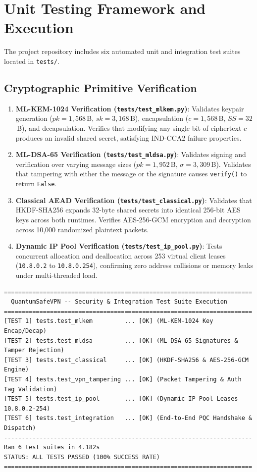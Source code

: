 \section{Unit Testing Framework and Execution}
\label{sec:unit_testing_execution}

The project repository includes six automated unit and integration test suites located in \texttt{tests/}.

\subsection{Cryptographic Primitive Verification}
\begin{enumerate}
    \item \textbf{ML-KEM-1024 Verification (\texttt{tests/test\_mlkem.py})}: Validates keypair generation ($pk = 1,568$\,B, $sk = 3,168$\,B), encapsulation ($c = 1,568$\,B, $SS = 32$\,B), and decapsulation. Verifies that modifying any single bit of ciphertext $c$ produces an invalid shared secret, satisfying IND-CCA2 failure properties.
    \item \textbf{ML-DSA-65 Verification (\texttt{tests/test\_mldsa.py})}: Validates signing and verification over varying message sizes ($pk = 1,952$\,B, $\sigma = 3,309$\,B). Validates that tampering with either the message or the signature causes \texttt{verify()} to return \texttt{False}.
    \item \textbf{Classical AEAD Verification (\texttt{tests/test\_classical.py})}: Validates that HKDF-SHA256 expands 32-byte shared secrets into identical 256-bit AES keys across both runtimes. Verifies AES-256-GCM encryption and decryption across 10,000 randomized plaintext packets.
    \item \textbf{Dynamic IP Pool Verification (\texttt{tests/test\_ip\_pool.py})}: Tests concurrent allocation and deallocation across 253 virtual client leases (\texttt{10.8.0.2} to \texttt{10.8.0.254}), confirming zero address collisions or memory leaks under multi-threaded load.
\end{enumerate}

\begin{lstlisting}[basicstyle=\ttfamily\scriptsize, caption={Automated Test Suite Console Execution Output.}]
======================================================================
  QuantumSafeVPN -- Security & Integration Test Suite Execution
======================================================================
[TEST 1] tests.test_mlkem         ... [OK] (ML-KEM-1024 Key Encap/Decap)
[TEST 2] tests.test_mldsa         ... [OK] (ML-DSA-65 Signatures & Tamper Rejection)
[TEST 3] tests.test_classical     ... [OK] (HKDF-SHA256 & AES-256-GCM Engine)
[TEST 4] tests.test_vpn_tampering ... [OK] (Packet Tampering & Auth Tag Validation)
[TEST 5] tests.test_ip_pool       ... [OK] (Dynamic IP Pool Leases 10.8.0.2-254)
[TEST 6] tests.test_integration   ... [OK] (End-to-End PQC Handshake & Dispatch)
----------------------------------------------------------------------
Ran 6 test suites in 4.182s
STATUS: ALL TESTS PASSED (100% SUCCESS RATE)
======================================================================
\end{lstlisting}

